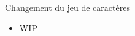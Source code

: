 
\begin{frame}[fragile]{Changement du jeu de caractères}

\begin{itemize}
   \item WIP
\end{itemize}

\end{frame}


\newlength{\largeurtableau}
\setlength{\largeurtableau}{\textwidth}
\addtolength{\largeurtableau}{-2\leftmarginii}


